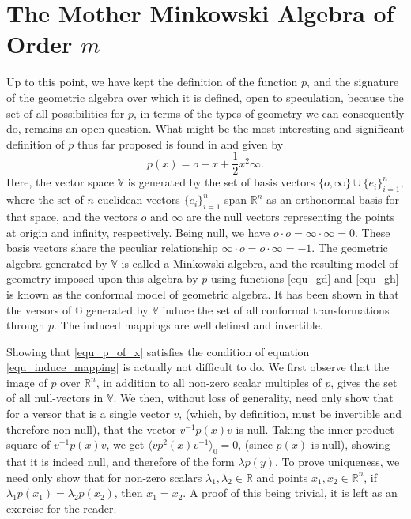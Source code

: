 \documentclass{birkjour}
\theoremstyle{definition}
\theoremstyle{remark}
\numberwithin{equation}{section}
\newcommand{\R}{\mathbb{R}}
\newcommand{\G}{\mathbb{G}}
\newcommand{\V}{\mathbb{V}}
\newcommand{\nvai}{\infty}
\newcommand{\nvao}{o}
\begin{document}
\section{The Mother Minkowski Algebra of Order $m$}

Up to this point, we have kept the definition of the function $p$, and the signature of the
geometric algebra over which it is defined,
open to speculation, because the set of all possibilities for $p$, in terms of the types of geometry
we can consequently do, remains an open question.  What might be the most interesting and significant
definition of $p$ thus far proposed is found in \cite{Hestenes01} and given by
\begin{equation}\label{equ_p_of_x}
p(x)=\nvao + x + \frac{1}{2}x^2\nvai.
\end{equation}
Here, the vector space $\V$ is generated by the set
of basis vectors $\{\nvao,\nvai\}\cup\{e_i\}_{i=1}^n$,
where the set of $n$ euclidean vectors $\{e_i\}_{i=1}^n$ span
$\R^n$ as an orthonormal basis for that space, and the
vectors $\nvao$ and $\nvai$ are the null vectors representing the
points at origin and infinity, respectively.  Being null, we have $\nvao\cdot\nvao=\nvai\cdot\nvai=0$.
These basis vectors share the peculiar relationship $\nvai\cdot\nvao=\nvao\cdot\nvai=-1$.  The geometric
algebra generated by $\V$ is called a Minkowski algebra, and the resulting model of
geometry imposed upon this algebra by $p$ using functions \eqref{equ_gd} and \eqref{equ_gh}
is known as the conformal model of geometric algebra.  It has been shown in
\cite{Hestenes01,LiRockwood01,Dorst07} that
the versors of $\G$ generated by $\V$ induce the set of all conformal transformations through $p$.
The induced mappings are well defined and invertible.

Showing that \eqref{equ_p_of_x} satisfies the condition of equation \eqref{equ_induce_mapping}
is actually not difficult to do.  We first observe that the image of $p$ over $\R^n$, in addition
to all non-zero scalar multiples of $p$, gives the
set of all null-vectors in $\V$.  We then, without loss of generality, need only show that for a versor that is a single
vector $v$, (which, by definition, must be invertible and therefore non-null), that the
vector $v^{-1}p(x)v$ is null.  Taking the inner product square of $v^{-1}p(x)v$,
we get $\langle vp^2(x)v^{-1}\rangle_0=0$, (since $p(x)$ is null), showing that it is indeed null, and therefore
of the form $\lambda p(y)$.  To prove uniqueness, we need only show that for non-zero
scalars $\lambda_1,\lambda_2\in\R$ and points $x_1,x_2\in\R^n$, if $\lambda_1p(x_1)=\lambda_2p(x_2)$,
then $x_1=x_2$.  A proof of this being trivial, it is left as an exercise for the reader.
\end{document}
